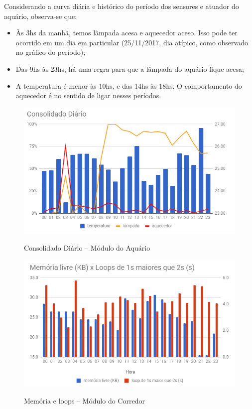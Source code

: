Considerando a curva diária e histórico do período dos sensores e atuador do aquário, observa-se que:

\begin{itemize}
	\item Às 3hs da manhã, temos lâmpada acesa e aquecedor aceso. Isso pode ter ocorrido em um dia em particular (25/11/2017, dia atípico, como observado no gráfico do período);
	\item Das 9hs às 23hs, há uma regra para que a lâmpada do aquário fique acesa;
	\item A temperatura é menor às 10hs, e das 14hs às 18hs. O comportamento do aquecedor é no sentido de ligar nesses períodos.

\end{itemize}

\begin{figure}[H]
	\centering
	\caption{Consolidado Diário -- Módulo do Aquário}
	\includegraphics[width=1.0\textwidth]{AquaDia}
	\label{fig:AquaDia}
\end{figure}

\begin{figure}[H]
	\centering
	\caption{Memória e loops -- Módulo do Corredor}
	\includegraphics[width=1.0\textwidth]{MemLivreCorredor}
	\label{fig:MemLivreCorredor}
\end{figure}

